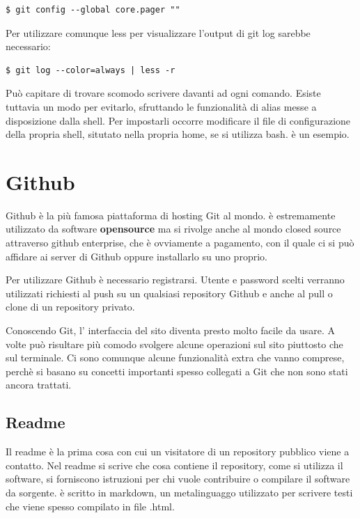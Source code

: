 \documentclass{article}
\begin{document}
\begin{verbatim}
$ git config --global core.pager ""
\end{verbatim}

Per utilizzare comunque less per visualizzare l'output di git log sarebbe
necessario:

\begin{verbatim}
$ git log --color=always | less -r 
\end{verbatim}

Può capitare di trovare scomodo scrivere  davanti ad ogni comando.
Esiste tuttavia un modo per evitarlo, sfruttando le funzionalità di alias messe
a disposizione dalla shell. Per impostarli occorre modificare il file di
configurazione della propria shell,  situtato nella propria home,
se si utilizza bash.
è un esempio.

\section{Github\label{github}}
Github è la più famosa piattaforma di hosting Git al mondo. è estremamente
utilizzato da software \textbf{opensource} ma si rivolge anche al mondo closed
source attraverso github enterprise, che è ovviamente a pagamento, con il quale
ci si può affidare ai server di Github oppure installarlo su uno proprio.

Per utilizzare Github è necessario registrarsi. Utente e password scelti
verranno utilizzati richiesti al push su un qualsiasi repository Github e anche
al pull o clone di un repository privato.

Conoscendo Git, l' interfaccia del sito diventa presto molto facile da usare.
A volte può risultare più comodo svolgere alcune operazioni sul sito piuttosto
che sul terminale.
Ci sono comunque alcune funzionalità extra che vanno comprese, perchè si basano su
concetti importanti spesso collegati a Git che non sono stati ancora trattati.

\subsection{Readme\label{readme}}
Il readme è la prima cosa con cui un visitatore di un repository pubblico viene
a contatto. Nel readme si scrive che cosa contiene il repository, come si
utilizza il software, si forniscono istruzioni per chi vuole contribuire o 
compilare il software da sorgente.
è scritto in markdown, un metalinguaggo utilizzato per scrivere testi che viene
spesso compilato in file .html.
\end{document}

